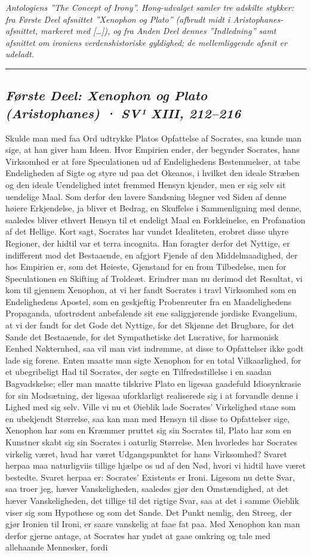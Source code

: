 \documentclass[12pt,a4paper]{article}
\newcommand{\worknote}[1]{{\small\itshape #1\par}\medskip\hrule\bigskip}
\newcommand{\sectionheading}[1]{\subsection*{\normalfont\itshape #1}}
\begin{document}
\worknote{Antologiens ''The Concept of Irony''. Hong-udvalget samler tre adskilte stykker: fra Første Deel afsnittet ''Xenophon og Plato'' (afbrudt midt i Aristophanes-afsnittet, markeret med […]), og fra Anden Deel dennes ''Indledning'' samt afsnittet om ironiens verdenshistoriske gyldighed; de mellemliggende afsnit er udeladt.}

\sectionheading{Første Deel: Xenophon og Plato (Aristophanes)  ·  SV¹ XIII, 212–216}

Skulde man med faa Ord udtrykke Platos Opfattelse af Socrates, saa kunde man sige, at han giver ham Ideen. Hvor Empirien ender, der begynder Socrates, hans Virksomhed er at føre Speculationen ud af Endelighedens Bestemmelser, at tabe Endeligheden af Sigte og styre ud paa det Okeanos, i hvilket den ideale Stræben og den ideale Uendelighed intet fremmed Hensyn kjender, men er sig selv sit uendelige Maal. Som derfor den lavere Sandsning blegner ved Siden af denne høiere Erkjendelse, ja bliver et Bedrag, en Skuffelse i Sammenligning med denne, saaledes bliver ethvert Hensyn til et endeligt Maal en Forkleinelse, en Profanation af det Hellige. Kort sagt, Socrates har vundet Idealiteten, erobret disse uhyre Regioner, der hidtil var et terra incognita. Han foragter derfor det Nyttige, er indifferent mod det Bestaaende, en afgjort Fjende af den Middelmaadighed, der hos Empirien er, som det Høieste, Gjenstand for en from Tilbedelse, men for Speculationen en Skifting af Troldeæt. Erindrer man nu derimod det Resultat, vi kom til gjennem Xenophon, at vi her fandt Socrates i travl Virksomhed som en Endelighedens Apostel, som en geskjeftig Probenreuter fra en Maadelighedens Propaganda, ufortrødent anbefalende sit ene saliggjørende jordiske Evangelium, at vi der fandt for det Gode det Nyttige, for det Skjønne det Brugbare, for det Sande det Bestaaende, for det Sympathetiske det Lucrative, for harmonisk Eenhed Nøkternhed, saa vil man vist indrømme, at disse to Opfattelser ikke godt lade sig forene. Enten maatte man sigte Xenophon for en total Vilkaarlighed, for et ubegribeligt Had til Socrates, der søgte en Tilfredsstillelse i en saadan Bagvadskelse; eller man maatte tilskrive Plato en ligesaa gaadefuld Idiosynkrasie for sin Modsætning, der ligesaa uforklarligt realiserede sig i at forvandle denne i Lighed med sig selv. Ville vi nu et Øieblik lade Socrates' Virkelighed staae som en ubekjendt Størrelse, saa kan man med Hensyn til disse to Opfattelser sige, Xenophon har som en Kræmmer pruttet sig sin Socrates til, Plato har som en Kunstner skabt sig sin Socrates i oaturlig Størrelse. Men hvorledes har Socrates virkelig været, hvad har været Udgangspunktet for hans Virksomhed? Svaret herpaa maa naturligviis tillige hjælpe os ud af den Nød, hvori vi hidtil have været bestedte. Svaret herpaa er: Socrates' Existents er Ironi. Ligesom nu dette Svar, saa troer jeg, hæver Vanskeligheden, saaledes gjør den Omstændighed, at det hæver Vanskeligheden, det tillige til det rigtige Svar, saa at det i samme Øieblik viser sig som Hypothese og som det Sande. Det Punkt nemlig, den Streeg, der gjør Ironien til Ironi, er saare vanskelig at faae fat paa. Med Xenophon kan man derfor gjerne antage, at Socrates har yndet at gaae omkring og tale med allehaande Mennesker, fordi 
\end{document}
